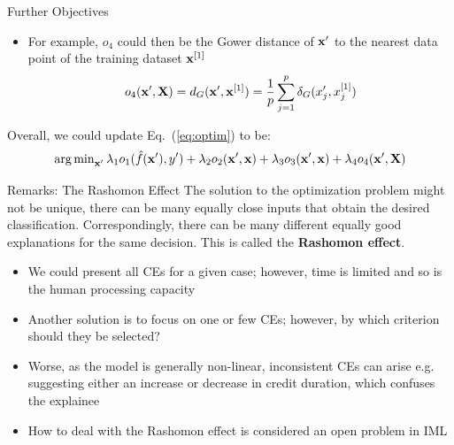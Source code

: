 \documentclass[11pt,compress,t,notes=noshow, aspectratio=169, xcolor=table]{beamer}
\begin{document}
\begin{frame}{Further Objectives}
	\begin{itemize}
	\item For example, $o_4$ could then be the Gower distance of $\xv'$ to the nearest data point of the training dataset $\xv^{[1]}$
	$$o_4(\xv', \Xmat) = \Gower(\xv', \xv^{[1]}) = \frac{1}{p} \sum_{j = 1}^{p}  \delta_G(x_j', x^{[1]}_j)$$
\end{itemize}

Overall, we could update Eq.~(\ref{eq:optim}) to be:
\begin{equation}
	\argmin_{\xv'} \lambda_1 o_1(\fh(\xv'), y') + \lambda_2 o_2(\xv', \xv) + \lambda_3 o_3(\xv', \xv) + \lambda_4 o_4(\xv', \Xmat)
\end{equation}

\end{frame}


\begin{frame}{Remarks: The Rashomon Effect}
The solution to the optimization problem might not be unique, there can be many equally close inputs that obtain the desired classification. Correspondingly, there can be many different equally good explanations for the same decision. This is called the \textbf{Rashomon effect}.
	\begin{itemize}
		\item We could present all CEs for a given case; however, time is limited and so is the human processing capacity
		\item Another solution is to focus on one or few CEs; however, by which criterion should they be selected?
		\item Worse, as the model is generally non-linear, inconsistent CEs can arise e.g. suggesting either an increase or decrease in credit duration, which confuses the explainee
		\item How to deal with the Rashomon effect is considered an open problem in IML
	\end{itemize}
\end{frame}
\end{document}

